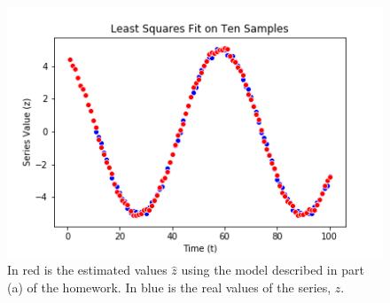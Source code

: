 \documentclass[12pt]{exam}
\begin{document}
\begin{questions}
\begin{solution}
  \end{solution}

  \begin{figure}[!ht]
    \centering
    \includegraphics{figures/least_squares_fit_series.png}
    \caption{In red is the estimated values $\hat{z}$ using the model described in part (a) of the homework. In blue is the real values of the series, $z$.}
    \label{fig:estimated_time_series}
  \end{figure}




\end{questions}
\end{document}
